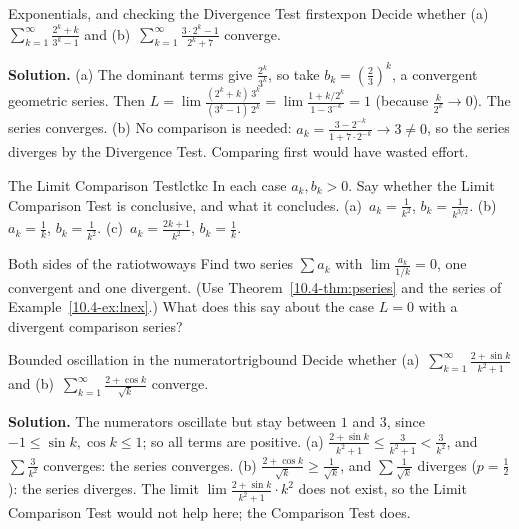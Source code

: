 \documentclass[11pt]{article}
\begin{document}
\begin{exmp}{Exponentials, and checking the Divergence Test first}{expon}
Decide whether (a)~$\displaystyle\sum_{k=1}^\infty\frac{2^k+k}{3^k-1}$ and (b)~$\displaystyle\sum_{k=1}^\infty\frac{3\cdot2^k-1}{2^k+7}$ converge.

\textbf{Solution.} (a) The dominant terms give $\frac{2^k}{3^k}$, so take $b_k=\left(\frac23\right)^k$, a convergent geometric series. Then $L=\lim\frac{(2^k+k)\,3^k}{(3^k-1)\,2^k}=\lim\frac{1+k/2^k}{1-3^{-k}}=1$ (because $\frac k{2^k}\to0$). The series converges.
(b) No comparison is needed: $a_k=\frac{3-2^{-k}}{1+7\cdot2^{-k}}\to3\ne0$, so the series diverges by the Divergence Test. Comparing first would have wasted effort.
\end{exmp}

\begin{kc}{The Limit Comparison Test}{lctkc}
In each case $a_k,b_k>0$. Say whether the Limit Comparison Test is conclusive, and what it concludes. (a)~$a_k=\frac1{k^2}$, $b_k=\frac1{k^{3/2}}$. (b)~$a_k=\frac1k$, $b_k=\frac1{k^2}$. (c)~$a_k=\frac{2k+1}{k^2}$, $b_k=\frac1k$.
\end{kc}

\begin{think}{Both sides of the ratio}{twoways}
Find two series $\sum a_k$ with $\lim\frac{a_k}{1/k}=0$, one convergent and one divergent. (Use Theorem~\ref{10.4-thm:pseries} and the series of Example~\ref{10.4-ex:lnex}.) What does this say about the case $L=0$ with a divergent comparison series?
\end{think}

\begin{exmp}{Bounded oscillation in the numerator}{trigbound}
Decide whether (a)~$\displaystyle\sum_{k=1}^\infty\frac{2+\sin k}{k^2+1}$ and (b)~$\displaystyle\sum_{k=1}^\infty\frac{2+\cos k}{\sqrt k}$ converge.

\textbf{Solution.} The numerators oscillate but stay between $1$ and $3$, since $-1\le\sin k,\cos k\le1$; so all terms are positive. (a) $\frac{2+\sin k}{k^2+1}\le\frac3{k^2+1}<\frac3{k^2}$, and $\sum\frac3{k^2}$ converges: the series converges. (b) $\frac{2+\cos k}{\sqrt k}\ge\frac1{\sqrt k}$, and $\sum\frac1{\sqrt k}$ diverges ($p=\frac12$): the series diverges. The limit $\lim\frac{2+\sin k}{k^2+1}\cdot k^2$ does not exist, so the Limit Comparison Test would not help here; the Comparison Test does.
\end{exmp}
\end{document}
